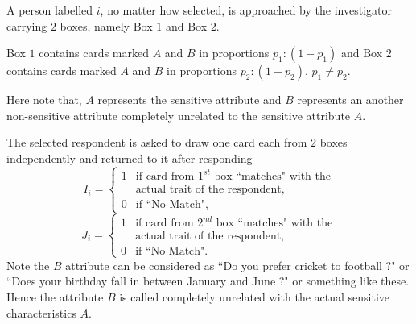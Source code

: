 \documentclass[12pt]{article}
\theoremstyle{definition}
\begin{document}
A person labelled $i$, no matter how selected, is approached by the investigator carrying $2$ boxes, namely Box $1$ and Box $2$.

Box $1$ contains  cards marked $A$ and $B$ in proportions $p_1:(1-p_1)$ and Box $2$ contains  cards marked $A$ and $B$ in proportions $p_2:(1-p_2)$, $p_1 \neq p_2$.

Here note that, $A$ represents the sensitive attribute and $B$ represents an another non-sensitive attribute completely unrelated to the sensitive attribute $A$.
 
 The selected respondent is asked to draw one card each from $2$ boxes independently and returned to it after responding
 $$I_i=\begin{cases}
 1 & \text{if card from $1^{st}$ box ``matches" with the}\\
  & \text{actual trait of the respondent,}\\
  0 & \text{if ``No Match",}
 \end{cases}$$
$$J_i=\begin{cases}
 1 & \text{if card from $2^{nd}$ box ``matches" with the}\\
  & \text{actual trait of the respondent,}\\
  0 & \text{if ``No Match".}
 \end{cases}$$
Note the $B$ attribute can be considered as ``Do you prefer cricket to football ?" or ``Does your birthday fall in between January and June ?" or something like these. Hence the attribute $B$ is called completely unrelated with the actual sensitive characteristics $A$.
\end{document}
